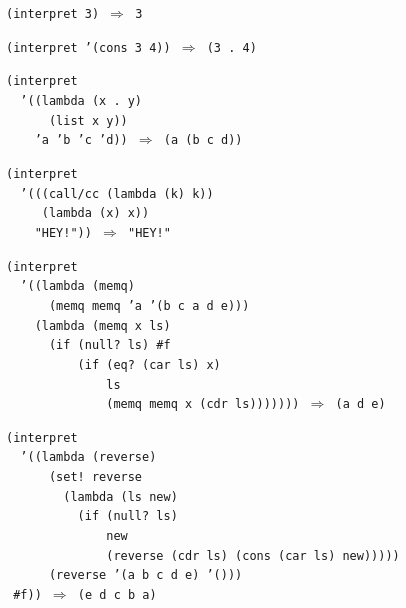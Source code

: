 \begin{alltt}
(interpret 3) \(\Rightarrow\) 3

(interpret '(cons 3 4)) \(\Rightarrow\) (3 . 4)

(interpret
  '((lambda (x . y)
      (list x y))
    'a 'b 'c 'd)) \(\Rightarrow\) (a (b c d))

(interpret
  '(((call/cc (lambda (k) k))
     (lambda (x) x))
    "HEY!")) \(\Rightarrow\) "HEY!"

(interpret
  '((lambda (memq)
      (memq memq 'a '(b c a d e)))
    (lambda (memq x ls)
      (if (null? ls) \#{}f
          (if (eq? (car ls) x)
              ls
              (memq memq x (cdr ls))))))) \(\Rightarrow\) (a d e)

(interpret
  '((lambda (reverse)
      (set! reverse
        (lambda (ls new)
          (if (null? ls)
              new
              (reverse (cdr ls) (cons (car ls) new)))))
      (reverse '(a b c d e) '()))
 \#{}f)) \(\Rightarrow\) (e d c b a)
\end{alltt}


